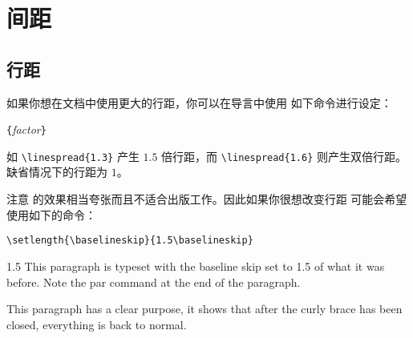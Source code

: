 \section{间距}

\subsection{行距}
%
如果你想在文档中使用更大的行距，你可以在导言中使用
如下命令进行设定：
\begin{lscommand}
\verb|{|\emph{factor}\verb|}|
\end{lscommand}
如 \verb|\linespread{1.3}| 产生 $1.5$ 倍行距，而 \verb|\linespread{1.6}| 
则产生双倍行距。缺省情况下的行距为 $1$。 

注意  的效果相当夸张而且不适合出版工作。因此如果你很想改变行距
可能会希望使用如下的命令：
\begin{lscommand}
\verb|\setlength{\baselineskip}{1.5\baselineskip}|
\end{lscommand}

\begin{example}
{\setlength{\baselineskip}%
           {1.5\baselineskip}
This paragraph is typeset with
the baseline skip set to 1.5 of
what it was before. Note the par
command at the end of the
paragraph.\par}

This paragraph has a clear
purpose, it shows that after the
curly brace has been closed,
everything is back to normal.
\end{example}

